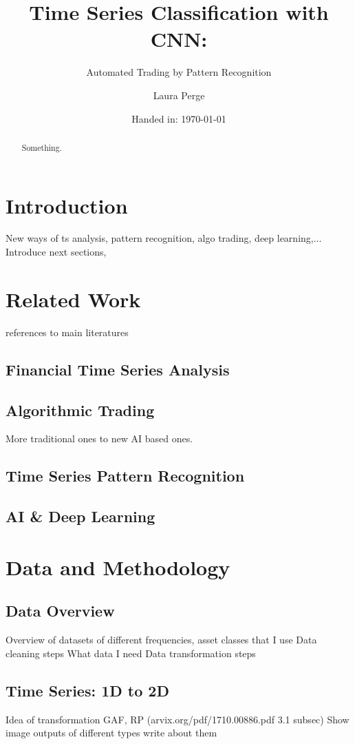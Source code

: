 \documentclass[11pt, a4paper]{article}
\author{Laura Perge}
\title{Time Series Classification with CNN:}
\subtitle{ Automated Trading by Pattern Recognition}
\date{Handed in: \today}
\begin{document}
\maketitle

\tableofcontents

\begin{abstract}
    Something.
\end{abstract}

\section{Introduction}
New ways of ts analysis, pattern recognition, algo trading, deep learning,...
Introduce next sections, 

\section{Related Work}

references to main literatures
\subsection{Financial Time Series Analysis}
\subsection{Algorithmic Trading}
More traditional ones to new AI based ones.
\subsection{Time Series Pattern Recognition}
\subsection{AI \& Deep Learning}


\section{Data and Methodology}
\subsection{Data Overview}
Overview of datasets of different frequencies, asset classes that I use
Data cleaning steps
What data I need
Data transformation steps 

\subsection{Time Series: 1D to 2D}
Idea of transformation
GAF, RP (arvix.org/pdf/1710.00886.pdf 3.1 subsec)
Show image outputs of different types
write about them 
\end{document}
